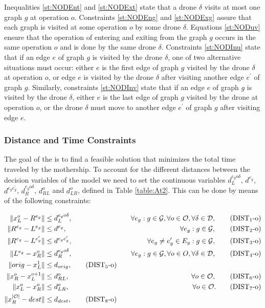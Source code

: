 \noindent 
 Inequalities \eqref{st:NODEnt} and \eqref{st:NODExt} state that a drone $\delta$ visits at most one graph $g$ at operation $o$.  Constraints \eqref{st:NODEng} and \eqref{st:NODExg} assure that each graph is visited at some operation $o$ by some drone $\delta$. Equations \eqref{st:NODuv} ensure that the operation of entering and exiting from the graph $g$ occurs in the same operation $o$ and is done by the same drone $\delta$. Constraints \eqref{st:NODInu} state that if an edge $e$ of graph $g$ is visited by the drone $\delta$, one of two alternative situations must occur: either $e$ is the first edge of graph $g$ visited by the drone $\delta$ at operation $o$, or edge $e$ is visited by the drone $\delta$ after visiting another edge $e^\prime$ of graph $g$. Similarly, constraints \eqref{st:NODInv} state that if an edge $e$ of graph $g$ is visited by the drone $\delta$, either $e$ is the last edge of graph $g$ visited by the drone at operation $o$, or the drone $\delta$ must move to another edge $e^\prime$ of graph $g$ after visiting edge $e$.

\subsubsection*{Distance and Time Constraints}
\noindent
 The goal of the \AMD\xspace is to find a feasible solution that minimizes the total time traveled by the mothership. To account for the different distances between the decision variables of the model we need to set the continuous variables $d_L^{e_go\delta}$, $d^{e_g}$, $d^{e_ge^\prime_g}$, $d_R^{e_go\delta}$, $d_{RL}^o$ and $d_{LR}^o$, defined in Table \ref{table:At2}. This can be done by means of the following constraints:
 

\begin{align*}
\|x_L^o- R^{e_g}\| & \leq  d_L^{e_go\delta},  &\quad \forall e_g:g\in \mathcal{G}, \forall o\in \mathcal O, \forall \delta\in\mathcal D, \tag{DIST$_{1}$-o} \label{eq:NOd1}\\
\|R^{e_g}- L^{e_g}\| & \leq  d^{e_g},  &\quad \forall e_g:g\in \mathcal{G}, \tag{DIST$_{2}$-o} \label{eq:NOd2}\\
\|R^{e_g}- L^{e^\prime_g}\| & \leq  d^{e_ge^\prime_g}, &\quad \forall e_g\neq e_g'\in E_g:g\in \mathcal{G}, \tag{DIST$_{3}$-o} \label{eq:NOd3}\\
\|L^{e_g}- x_R^o\| & \leq  d_R^{e_go\delta}, &\quad \forall e_g:g\in \mathcal{G},\forall o\in O, \forall \delta\in\mathcal D, \tag{DIST$_{4}$-o} \label{eq:NOd4}\\
\|orig - x_L^1\| & \leq d_{orig}, \tag{DIST$_5$-o}\label{eq:NOd5}\\
\|x_R^o- x_L^{o+1}\| & \leq  d_{RL}^o, & \quad \forall o\in \mathcal O, \tag{DIST$_{6}$-o} \label{eq:NOd6}\\
\|x_L^o- x_R^o\| & \leq  d_{LR}^o, & \quad \forall o\in \mathcal O. \tag{DIST$_{7}$-o} \label{eq:NOd7}\\
\|x_R^{|\mathcal O|} - dest\| & \leq d_{dest}, \tag{DIST$_8$-o}\label{eq:NOd8}\\
\end{align*}

